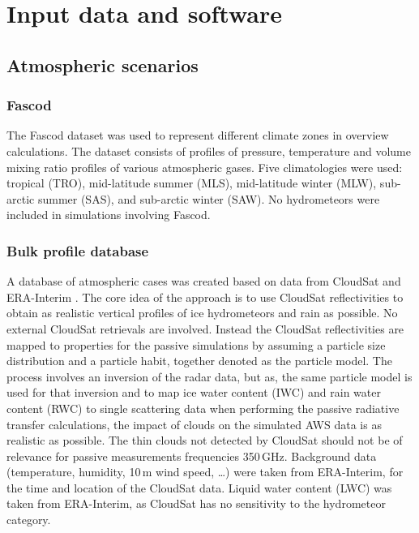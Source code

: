 \documentclass[12pt]{article}
\begin{document}
\section{Input data and software}

\subsection{Atmospheric scenarios}

\subsubsection{Fascod}
\label{sec:fascod}
%
The Fascod dataset \citep{anderson1986afgl} was used to represent different
climate zones in overview calculations. The dataset consists of profiles of
pressure, temperature and volume mixing ratio profiles of various atmospheric
gases. Five climatologies were used: tropical (TRO), mid-latitude summer (MLS),
mid-latitude winter (MLW), sub-arctic summer (SAS), and sub-arctic winter
(SAW). No hydrometeors were included in simulations involving Fascod.


\subsubsection{Bulk profile database}
%
A database of atmospheric cases was created based on data from CloudSat \citep{stephens2002bams} and
ERA-Interim \citep{dee2011qjrms}. The core idea of the approach is to use CloudSat reflectivities to
obtain as realistic vertical profiles of ice hydrometeors and rain as
possible. No external CloudSat retrievals are involved. Instead the CloudSat
reflectivities are mapped to properties for the passive simulations by assuming
a particle size distribution and a particle habit, together denoted as
the particle model. The process involves an inversion of the radar data, but as,
the same particle model is used for that inversion and to map ice water content
(IWC) and rain water content (RWC) to single scattering data when performing
the passive radiative transfer calculations, the impact of clouds on the
simulated AWS data is as realistic as possible. The thin clouds not detected by
CloudSat should not be of relevance for passive measurements frequencies
350\,GHz. Background data (temperature, humidity, 10\,m wind speed, \dots) were
taken from ERA-Interim, for the time and location of the CloudSat data. Liquid
water content (LWC) was taken from ERA-Interim, as CloudSat has no sensitivity
to the hydrometeor category.
\end{document}
